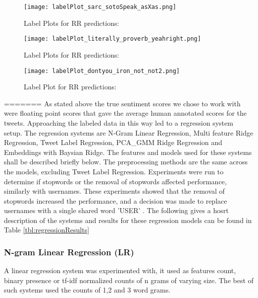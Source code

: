 \documentclass[11pt,letterpaper]{article}
\begin{document}
\begin{figure}[ht!]
    \centering
    \texttt{[image: labelPlot\_sarc\_sotoSpeak\_asXas.png]}
    \caption{Label Plots for RR predictions:}
    \label{fig:LabelPlot.Sarc,soto,asX}
\end{figure}

\begin{figure}[ht!]
    \centering
    \texttt{[image: labelPlot\_literally\_proverb\_yeahright.png]}
    \caption{Label Plots for RR predictions:}
    \label{fig:LabelPlot.lit,prov,yeahright}
\end{figure}

\begin{figure}[ht!]
    \centering
    \texttt{[image: labelPlot\_dontyou\_iron\_not\_not2.png]}
    \caption{Label Plot  for RR predictions:}
    \label{fig:dontyou,iron,not,not2}
\end{figure}
=======
As stated above the true sentiment scores we chose to work with were floating point scores that gave the average human annotated scores for the tweets. Approaching the labeled data in this way led to a regression system setup.
The regression systems are N-Gram Linear Regression, Multi feature  Ridge Regression, Tweet Label Regression, PCA\_GMM Ridge Regression and Embeddings with Baysian Ridge. The features and models used for these systems shall be described briefly below. The preprocessing methods are the same across the models, excluding Tweet Label Regression. Experiments were run to determine if stopwords or the removal of stopwords affected performance, similarly with usernames. These experiments showed that the removal of stopwords increased the performance, and a decision was made to replace usernames with a single shared word 'USER' .  The following gives a hosrt description of the systems and results for these regression models can be found in Table \ref{tbl:regressionResults}

\subsubsection{N-gram Linear Regression (LR)}
A linear regression system was experimented with, it used as features count, binary presence or tf-idf normalized counts of  n grams of varying size. The best of such systems used the counts of 1,2 and 3 word grams. 
\end{document}
